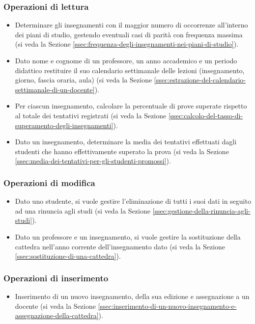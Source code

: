 \subsubsection{Operazioni di lettura}
\label{sssec:operazioni-di-lettura}
\begin{itemize}
    \item Determinare gli insegnamenti con il maggior numero di occorrenze all'interno dei piani di studio, gestendo eventuali casi di parità con frequenza massima (si veda la Sezione \ref{ssec:frequenza-degli-insegnamenti-nei-piani-di-studio}).
    \item Dato nome e cognome di un professore, un anno accademico e un periodo didattico restituire il suo calendario settimanale delle lezioni (insegnamento, giorno, fascia oraria, aula) (si veda la Sezione \ref{ssec:estrazione-del-calendario-settimanale-di-un-docente}).
    \item Per ciascun insegnamento, calcolare la percentuale di prove superate rispetto al totale dei tentativi registrati (si veda la Sezione \ref{ssec:calcolo-del-tasso-di-superamento-degli-insegnamenti}).
    \item Dato un insegnamento, determinare la media dei tentativi effettuati dagli studenti che hanno effettivamente superato la prova (si veda la Sezione \ref{ssec:media-dei-tentativi-per-gli-studenti-promossi}).
\end{itemize}

\subsubsection{Operazioni di modifica}
\label{sssec:operazioni-di-modifica}
\begin{itemize}
    \item Dato uno studente, si vuole gestire l'eliminazione di tutti i suoi dati in seguito ad una rinuncia agli studi (si veda la Sezione \ref{ssec:gestione-della-rinuncia-agli-studi}).
    \item Dato un professore e un insegnamento, si vuole gestire la sostituzione della cattedra nell'anno corrente dell'insegnamento dato (si veda la Sezione \ref{ssec:sostituzione-di-una-cattedra}).
\end{itemize}

\subsubsection{Operazioni di inserimento}
\label{sssec:operazioni-di-inserimento}
\begin{itemize}
    \item Inserimento di un nuovo insegnamento, della sua edizione e assegnazione a un docente (si veda la Sezione \ref{ssec:inserimento-di-un-nuovo-insegnamento-e-assegnazione-della-cattedra}).
\end{itemize}
